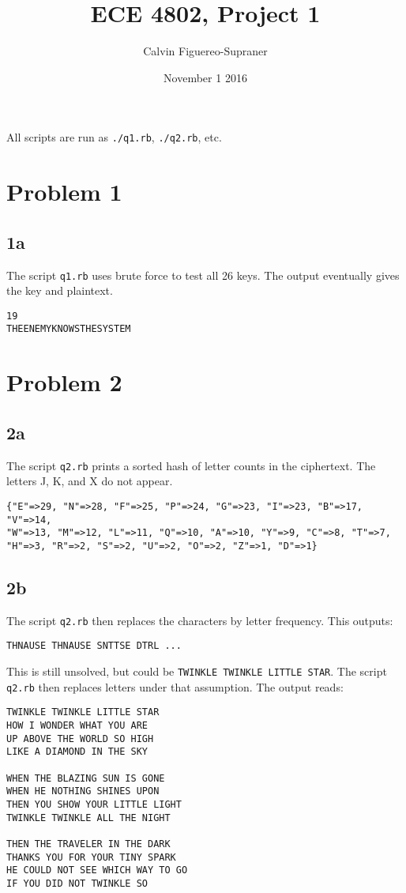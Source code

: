 \documentclass[letterpaper, 12pt]{article}
\title{ECE 4802, Project 1}
\author{Calvin Figuereo-Supraner}
\date{November 1 2016}
\begin{document}
\maketitle
All scripts are run as \texttt{./q1.rb}, \texttt{./q2.rb}, etc.
\newpage

\section*{Problem 1}
\subsection*{1a}
The script \texttt{q1.rb}  uses brute force to test all 26 keys. The output eventually gives the key and plaintext.
\begin{Verbatim}[frame=single]
19
THEENEMYKNOWSTHESYSTEM
\end{Verbatim}

\section*{Problem 2}
\subsection*{2a}
The script \texttt{q2.rb} prints a sorted hash of letter counts in the ciphertext. The letters J, K, and X do not appear.
\begin{Verbatim}[frame=single]
{"E"=>29, "N"=>28, "F"=>25, "P"=>24, "G"=>23, "I"=>23, "B"=>17, "V"=>14,
"W"=>13, "M"=>12, "L"=>11, "Q"=>10, "A"=>10, "Y"=>9, "C"=>8, "T"=>7,
"H"=>3, "R"=>2, "S"=>2, "U"=>2, "O"=>2, "Z"=>1, "D"=>1}
\end{Verbatim}

\subsection*{2b}
The script \texttt{q2.rb} then replaces the characters by letter frequency. This outputs:
\begin{Verbatim}[frame=single]
THNAUSE THNAUSE SNTTSE DTRL ...
\end{Verbatim}

This is still unsolved, but could be \texttt{TWINKLE TWINKLE LITTLE STAR}. The script \texttt{q2.rb} then replaces letters under that assumption. The output reads:
\begin{Verbatim}[frame=single]
TWINKLE TWINKLE LITTLE STAR
HOW I WONDER WHAT YOU ARE
UP ABOVE THE WORLD SO HIGH
LIKE A DIAMOND IN THE SKY

WHEN THE BLAZING SUN IS GONE
WHEN HE NOTHING SHINES UPON
THEN YOU SHOW YOUR LITTLE LIGHT
TWINKLE TWINKLE ALL THE NIGHT

THEN THE TRAVELER IN THE DARK 
THANKS YOU FOR YOUR TINY SPARK
HE COULD NOT SEE WHICH WAY TO GO
IF YOU DID NOT TWINKLE SO
\end{Verbatim}
\end{document}
